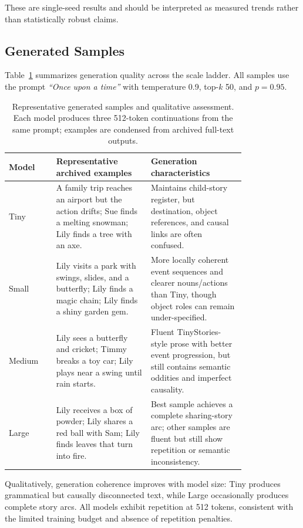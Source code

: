 \documentclass{article}
\begin{document}
These are single-seed results and should be interpreted as measured trends rather than statistically robust claims.
\FloatBarrier

\subsection{Generated Samples}

Table~\ref{tab:samples} summarizes generation quality across the scale ladder. All samples use the prompt \emph{``Once upon a time''} with temperature 0.9, top-$k$ 50, and $p{=}0.95$.

\begin{table}[H]
\centering
\scriptsize
\caption{Representative generated samples and qualitative assessment. Each model produces three 512-token continuations from the same prompt; examples are condensed from archived full-text outputs.}
\label{tab:samples}
\begin{tabular}{lp{0.40\linewidth}p{0.40\linewidth}}
\toprule
Model & Representative archived examples & Generation characteristics \\
\midrule
Tiny & A family trip reaches an airport but the action drifts; Sue finds a melting snowman; Lily finds a tree with an axe. & Maintains child-story register, but destination, object references, and causal links are often confused. \\
Small & Lily visits a park with swings, slides, and a butterfly; Lily finds a magic chain; Lily finds a shiny garden gem. & More locally coherent event sequences and clearer nouns/actions than Tiny, though object roles can remain under-specified. \\
Medium & Lily sees a butterfly and cricket; Timmy breaks a toy car; Lily plays near a swing until rain starts. & Fluent TinyStories-style prose with better event progression, but still contains semantic oddities and imperfect causality. \\
Large & Lily receives a box of powder; Lily shares a red ball with Sam; Lily finds leaves that turn into fire. & Best sample achieves a complete sharing-story arc; other samples are fluent but still show repetition or semantic inconsistency. \\
\bottomrule
\end{tabular}
\end{table}

Qualitatively, generation coherence improves with model size: Tiny produces grammatical but causally disconnected text, while Large occasionally produces complete story arcs. All models exhibit repetition at 512 tokens, consistent with the limited training budget and absence of repetition penalties.
\FloatBarrier
\end{document}
